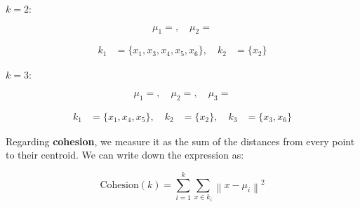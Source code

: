 \documentclass[12pt]{article}
\begin{document}
\begin{enumerate}[leftmargin=\labelsep]
  \begin{paracol}{2}
    \setlength{\columnseprule}{1pt}
    \def\columnseprulecolor{\color{black}}
    \centering

    $k = 2$:

    \begin{equation*}
      \mu_1 = , \quad \mu_2 = 
    \end{equation*}

    \begin{equation*}
      \begin{aligned}
        k_1 & = \{x_1, x_3, x_4, x_5, x_6\}, \quad
        k_2 & = \{x_2\}
      \end{aligned}
    \end{equation*}

    \switchcolumn

    $k = 3$:

    \begin{equation*}
      \mu_1 = , \quad \mu_2 = , \quad \mu_3 = 
    \end{equation*}

    \begin{equation*}
      \begin{aligned}
        k_1 & = \{x_1, x_4, x_5\}, \quad
        k_2 & = \{x_2\}, \quad
        k_3 & = \{x_3, x_6\}
      \end{aligned}
    \end{equation*}

  \end{paracol}

  Regarding \textbf{cohesion}, we measure it as the sum of the distances from every
  point to their centroid. We can write down the expression as:

  \begin{equation*}
    \text{Cohesion}(k) = \sum_{i = 1}^k \sum_{x \in k_i} \left\| x - \mu_i \right\|^2
  \end{equation*}


\end{enumerate}
\end{document}

